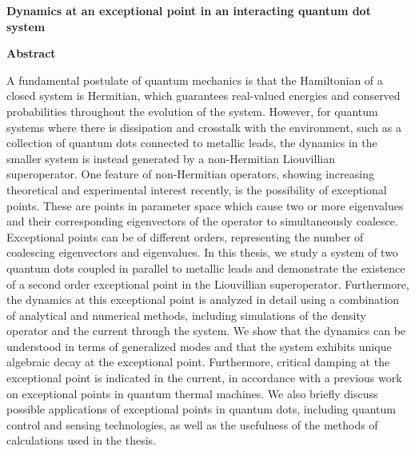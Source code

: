 \documentclass[../main.tex]{subfiles}
\begin{document}
\thispagestyle{plain}
\begin{center}
    \Large
    \textbf{Dynamics at an exceptional point in an interacting quantum dot system}
    
    \vspace{0.4cm}
    
    \vspace{0.4cm}
    
    \vspace{0.9cm}
    \textbf{Abstract}
\end{center}
A fundamental postulate of quantum mechanics is that the Hamiltonian of a closed system is Hermitian, which guarantees real-valued energies and conserved probabilities throughout the evolution of the system. However, for quantum systems where there is dissipation and crosstalk with the environment, such as a collection of quantum dots connected to metallic leads, the dynamics in the smaller system is instead generated by a non-Hermitian Liouvillian superoperator. One feature of non-Hermitian operators, showing increasing theoretical and experimental interest recently, is the possibility of exceptional points. These are points in parameter space which cause two or more eigenvalues and their corresponding eigenvectors of the operator to simultaneously coalesce. Exceptional points can be of different orders, representing the number of coalescing eigenvectors and eigenvalues. In this thesis, we study a system of two quantum dots coupled in parallel to metallic leads and demonstrate the existence of a second order exceptional point in the Liouvillian superoperator. Furthermore, the dynamics at this exceptional point is analyzed in detail using a combination of analytical and numerical methods, including simulations of the density operator and the current through the system. We show that the dynamics can be understood in terms of generalized modes and that the system exhibits unique algebraic decay at the exceptional point. Furthermore, critical damping at the exceptional point is indicated in the current, in accordance with a previous work on exceptional points in quantum thermal machines. We also briefly discuss possible applications of exceptional points in quantum dots, including quantum control and sensing technologies, as well as the usefulness of the methods of calculations used in the thesis.
\end{document}
